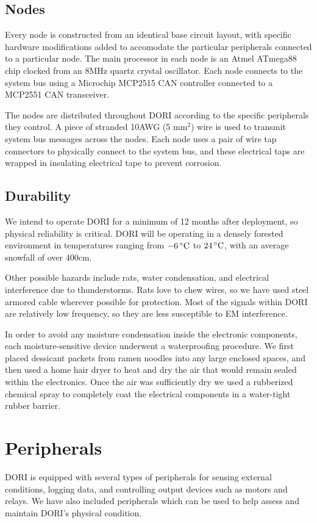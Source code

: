     \section{Nodes}
    Every node is constructed from an identical base circuit layout, with specific hardware modifications added to accomodate the particular peripherals connected to a particular node. The main processor in each node is an Atmel ATmega88 chip clocked from an 8MHz quartz crystal oscillator. Each node connects to the system bus using a Microchip MCP2515 CAN controller connected to a MCP2551 CAN transceiver.

    The nodes are distributed throughout DORI according to the specific peripherals they control. A piece of stranded 10AWG (5 mm$^2$) wire is used to transmit system bus messages across the nodes. Each node uses a pair of wire tap connectors to physically connect to the system bus, and these electrical taps are wrapped in insulating electrical tape to prevent corrosion.


    \section{Durability}
We intend to operate \textsc{DORI} for a minimum of 12 months after deployment, so physical reliability is critical. \textsc{DORI} will be operating in a densely forested environment in temperatures ranging from $-6\,^{\circ}\mathrm{C}{}$ to $24\,^{\circ}\mathrm{C}{}$, with an average snowfall of over 400cm.

Other possible hazards include rats, water condensation, and electrical interference due to thunderstorms. Rats love to chew wires, so we have used steel armored cable wherever possible for protection. Most of the signals within \textsc{DORI} are relatively low frequency, so they are less susceptible to EM interference.

In order to avoid any moisture condensation inside the electronic components, each moisture-sensitive device underwent a waterproofing procedure. We first placed dessicant packets from ramen noodles into any large enclosed spaces, and then used a home hair dryer to heat and dry the air that would remain sealed within the electronics. Once the air was sufficiently dry we used a rubberized chemical spray to completely coat the electrical components in a water-tight rubber barrier.

\chapter{Peripherals}
    DORI is equipped with several types of peripherals for sensing external conditions, logging data, and controlling output devices such as motors and relays. We have also included peripherals which can be used to help assess and maintain DORI's physical condition.

